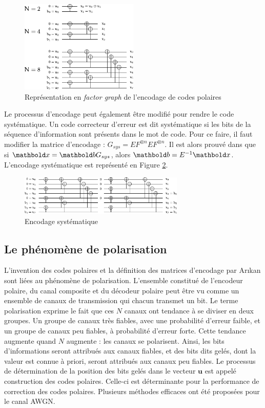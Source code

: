 \begin{figure}[t]
\centering
\includegraphics[width=0.5\textwidth]{main/ch1_fig/Graph_N_rec}
\caption{Représentation en \textit{factor graph} de l'encodage de codes polaires}
\label{fig:encodage}
\end{figure}

Le processus d'encodage peut également être modifié pour rendre le code systématique. Un code correcteur d'erreur est dit systématique si les bits de la séquence d'information sont présents dans le mot de code. Pour ce faire, il faut modifier la matrice d'encodage : $G_{sys}=EF^{\otimes n}EF^{\otimes n}$. Il est alors prouvé dans \cite{arikan_systematic_2011} que si $\mb{x}=\mb{b}G_{sys}$, alors $\mb{b}=E^{-1}\mb{x}$. L'encodage systématique est représenté en Figure \ref{fig:sys}.

\begin{figure}[t]
\centering
\includegraphics[width=0.7\textwidth]{main/ch1_fig/Graph_N_sys}
\caption{Encodage systématique}
\label{fig:sys}
\end{figure}

\subsection{Le phénomène de polarisation}
\label{subsec:polarisation}
L'invention des codes polaires et la définition des matrices d'encodage par Ar{\i}kan \cite{arikan_channel_2009} sont liées au phénomène de polarisation. L'ensemble constitué de l'encodeur polaire, du canal composite et du décodeur polaire peut être vu comme un ensemble de canaux de transmission qui chacun transmet un bit. Le terme \og polarisation \fg exprime le fait que ces $N$ canaux ont tendance à se diviser en deux groupes. Un groupe de canaux très fiables, avec une probabilité d'erreur faible, et un groupe de canaux peu fiables, à probabilité d'erreur forte. Cette tendance augmente quand $N$ augmente : les canaux se polarisent. Ainsi, les bits d'informations seront attribués aux canaux fiables, et des bits dits gelés, dont la valeur est connue à priori, seront attribués aux canaux peu fiables. Le processus de détermination de la position des bits gelés dans le vecteur $\mathbold{u}$ est appelé construction des codes polaires. Celle-ci est déterminante pour la performance de correction des codes polaires. Plusieurs méthodes efficaces ont été proposées \cite{tal_how_2013,trifonov_efficient_2012} pour le canal AWGN.

